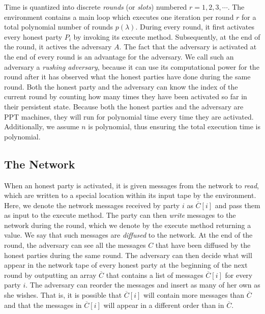 Time is quantized into discrete \emph{rounds} (or \emph{slots}) numbered $r = 1, 2, 3, \cdots$.
The
environment contains a main loop which executes one iteration per round $r$ for
a total polynomial number of rounds $p(\lambda)$. During
every round, it first activates every honest party $P_i$ by invoking its
\textsf{execute} method. Subsequently, at the end of
the round, it actives the adversary $A$. The fact that the adversary is activated at
the end of every round is an advantage for the adversary. We call such an
adversary a \emph{rushing adversary}, because it can use its computational power
for the round after it has observed what the honest parties have done during the
same round. Both the honest party and the adversary can know the index of the
current round by counting how many times they have been activated so far in
their persistent state. Because both the honest parties and the
adversary are PPT machines, they will run for polynomial time every time they
are activated. Additionally, we assume $n$ is polynomial, thus ensuring the
total execution time is polynomial.

\subsection{The Network}

When an honest party is activated, it is given messages from the network to
\emph{read}, which are written to a special location within its input tape by
the environment. Here, we denote the network messages received by party $i$ as
$\overline{C}[i]$ and pass them as input to the \textsf{execute} method. The
party can then \emph{write} messages to the network during the round, which we
denote by the \textsf{execute} method returning a value. We say that such
messages are \emph{diffused} to the network. At the end of the
round, the adversary can see all the messages $C$ that have been diffused by the
honest parties during the same round. The adversary can then decide what will
appear in the network tape of every honest party at the beginning of the next
round by outputting an array $\overline{C}$ that contains a list of messages
$\overline{C}[i]$ for every party $i$. The adversary can reorder the messages and
insert as many of her own as she wishes. That is, it is possible that
$\overline{C}[i]$ will contain more messages than $\overline{C}$ and that the
messages in $\overline{C}[i]$ will appear in a different order than in
$\overline{C}$.

